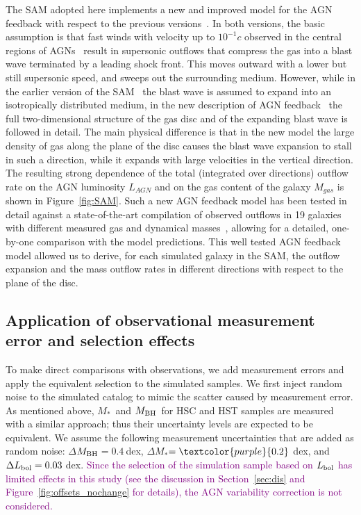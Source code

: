 \documentclass[twocolumn]{aastex631}
\newcommand{\red}[1]{\textcolor{purple}{#1}}
\def\smass{{$M_*$}}
\def\mbh{$M_{\rm BH}$}
\begin{document}
The SAM adopted here implements a new and improved  model for the AGN feedback with respect to the previous versions~\citep{Menci2008}. In both versions, the basic assumption is that fast winds with velocity up to $10^{-1}c$ observed in the central regions of AGNs~\citep{Chartas2002, Pounds2003}  result in  supersonic outflows that compress the gas into a blast wave terminated by a leading shock front. This  moves outward with a lower but still supersonic speed, and sweeps out the surrounding medium. However, while in the earlier version of the SAM~\citep{Menci2016} the blast wave is assumed to expand into an isotropically distributed medium, in the new description of AGN feedback~\citep{Menci2019} the full two-dimensional structure of the gas disc and of the expanding blast wave is followed in detail. The main physical difference is that in the new model the large density of gas along the plane of the disc causes the blast wave expansion to stall in such a direction, while it expands with large velocities in the vertical direction. The resulting strong dependence of the total (integrated over directions) outflow rate on the AGN luminosity $L_{AGN}$ and on the gas content of the galaxy $M_{gas}$ is shown in Figure~\ref{fig:SAM}. Such a new AGN feedback model has been tested in detail against a state-of-the-art compilation of observed outflows in 19 galaxies with different measured gas and dynamical masses~\citep{Fiore2017}, allowing for a detailed, one-by-one comparison with the model predictions. This well tested AGN feedback model allowed us to derive, for each simulated galaxy in the SAM,  the outflow expansion and the mass outflow rates in different directions with respect to the plane of the disc.



\subsection{Application of observational measurement error and selection effects}\label{subsec:add_obs_eff}
To make direct comparisons with observations, we add measurement errors and apply the equivalent selection to the simulated samples. We first inject random noise to the simulated catalog to mimic the scatter caused by measurement error. As mentioned above, \smass\ and \mbh\ for HSC and HST samples are measured with a similar approach; thus their uncertainty levels are expected to be equivalent. We assume the following measurement uncertainties that are added as random noise: $\Delta$\mbh$ = 0.4~$dex, $\Delta$\smass$ = \red{0.2}~$dex, and $\Delta L_{\rm bol} = 0.03~$dex. \red{Since the selection of the simulation sample based on $L_{\rm bol}$ has limited effects in this study (see the discussion in Section~\ref{sec:dis} and Figure~\ref{fig:offsets_nochange} for details), the AGN variability correction is not considered.}
\end{document}
